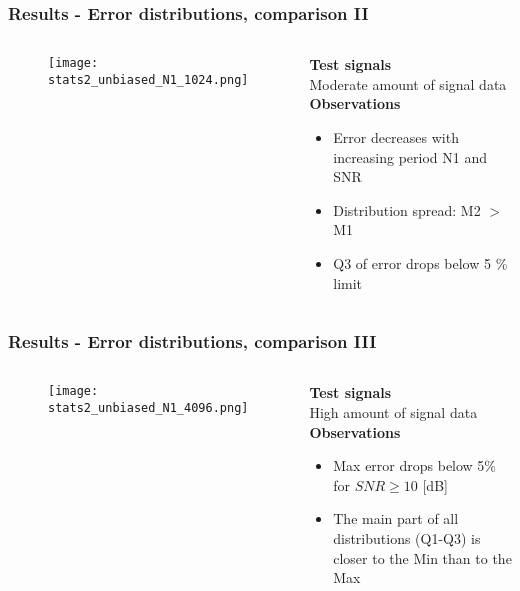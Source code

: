 \documentclass[11pt,aspectratio=169]{beamer}
\begin{document}
	\begin{frame}
		\frametitle{Results - Error distributions, comparison II}
		\begin{columns}[t]
			\begin{RIPcolleft}
				\begin{figure}
					\texttt{[image: stats2\_unbiased\_N1\_1024.png]}
				\end{figure}
			\end{RIPcolleft}
			\begin{RIPcolright}
				\textbf{Test signals}\\
				Moderate amount of signal data\\
				\vspace*{.5em}
				\textbf{Observations}\\
				\begin{itemize}
					\item Error decreases with increasing period N1 and SNR
					\item Distribution spread: \hfill{} M2 $>$ M1
					\item Q3 of error drops below 5 \% limit
				\end{itemize}
			\end{RIPcolright}
		\end{columns}
	\end{frame}
	\begin{frame}
		\frametitle{Results - Error distributions, comparison III}
		\begin{columns}[t]
			\begin{RIPcolleft}
				\begin{figure}
					\texttt{[image: stats2\_unbiased\_N1\_4096.png]}
				\end{figure}
			\end{RIPcolleft}
			\begin{RIPcolright}
				\textbf{Test signals}\\
				High amount of signal data\\
				\vspace*{.5em}
				\textbf{Observations}\\
				\begin{itemize}
					\item Max error drops below 5\% for $SNR \ge 10$ [dB]
					\item The main part of all distributions (Q1-Q3) is closer to the Min than to the Max
				\end{itemize}
			\end{RIPcolright}
		\end{columns}
	\end{frame}
\end{document}
